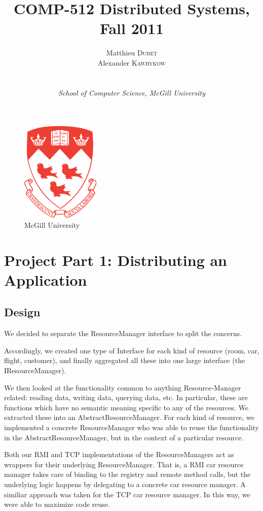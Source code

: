 \documentclass[a4paper]{article}
\title{COMP-512 Distributed Systems, Fall 2011}
\author{
Matthieu \textsc{Dubet} \\
Alexander \textsc{Kawrykow} \\ \\ \\
\emph{School of Computer Science, McGill University }
}
\begin{document}
\maketitle
\begin{figure}
  \centering
	\includegraphics[scale=0.8]{mcgill_logo.png}
  \caption{McGill University}
  \label{mcgill}
\end{figure}
\tableofcontents
\clearpage

\section{Project Part 1: Distributing an Application}
\subsection{Design}

We decided to separate the ResourceManager interface to split the concerns. 

Accordingly, we created one type of Interface for each kind of resource (room, car, flight, customer), and finally aggregated all these into one large interface (the IResourceManager). 

We then looked at the functionality common to anything Resource-Manager related: reading data, writing data, querying data, etc. In particular,
these are functions which have no semantic meaning specific to any of the resources. We extracted these into an AbstractResourceManager.
For each kind of resource, we implemented a concrete ResourceManager who was able to reuse the functionality in the AbstractResourceManager, 
but in the context of a particular resource. 


Both our RMI and TCP implementations of the ResourceManagers act as wrappers for their underlying ResourceManager. That is, a RMI car resource manager
takes care of binding to the registry and remote method calls, but the underlying logic happens by delegating to a concrete car resource manager. A
similiar approach was taken for the TCP car resource manager. In this way, we were able to maximize code reuse. 
\end{document}
